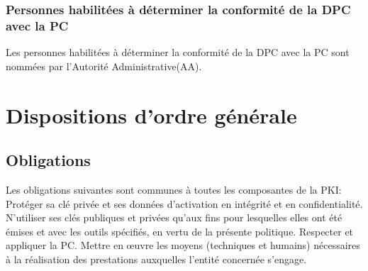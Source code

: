 \documentclass[a4paper,11pt,french]{book}
\begin{document}
\subsubsection{Personnes habilitées à déterminer la conformité de la DPC avec la PC}

Les personnes habilitées à déterminer la conformité de la DPC avec la PC sont nommées par l’Autorité Administrative(AA).

\section{Dispositions d'ordre générale}
\subsection{Obligations}
Les obligations suivantes sont communes à toutes les composantes de la PKI:
Protéger sa clé privée et ses données d’activation en intégrité et en confidentialité.
N’utiliser ses clés publiques et privées qu’aux fins pour lesquelles elles ont été émises et avec les outils spécifiés, en vertu de la présente politique.
Respecter et appliquer la PC.
Mettre en œuvre les moyens (techniques et humains) nécessaires à la réalisation des prestations auxquelles l’entité concernée s’engage.
\end{document}
